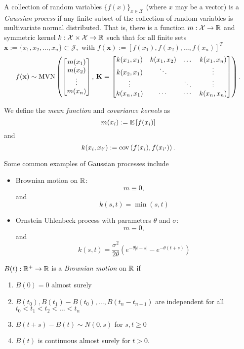\begin{definition}\label{def:gp}
    A collection of random variables $\{f(x)\}_{x\in\mathcal{X}}$
    (where $x$ may be a vector) is a \emph{Gaussian process} if any finite
    subset of the collection of random variables is multivariate normal
    distributed. That is, there is a function $m:\mathcal{X}\to\mathbb{R}$ and
    symmetric kernel $k:\mathcal{X}\times\mathcal{X}\to \mathbb{R}$ such that for all finite sets
    $\mathbf{x} :=\{x_1, x_2, \dots, x_n\} \subset \mathcal{J},$ with
    $f(\mathbf{x}) := [f(x_1), f(x_2), \dots, f(x_n)]^T$
    $$f(\mathbf{x}) \sim
        \operatorname{MVN}\left(\begin{bmatrix}
            m(x_1) \\ m(x_2)\\ \vdots\\ m(x_n)
        \end{bmatrix},\, \mathbf{K} = \begin{bmatrix}
            k(x_1, x_1) & k(x_1, x_2) & \dots  & k(x_1, x_n) \\
            k(x_2, x_1) & \ddots      &        & \vdots      \\
            \vdots      &             & \ddots & \vdots      \\
            k(x_n, x_1) & \cdots      & \cdots & k(x_n, x_n)
        \end{bmatrix}\right).$$
\end{definition}

\begin{definition}\label{def:mean_kernel}
    We define the \emph{mean function} and \emph{covariance kernels} as
    $$m(x_i) := \operatorname{\mathbb{E}}\left[f(x_i)\right]$$ and
    $$k(x_{i}, x_{i^\prime}) := \operatorname{cov}\left(f(x_i), f(x_{i^\prime})\right).$$
\end{definition}

Some common examples of Gaussian processes include \begin{itemize}
    \item Brownian motion on $\mathbb{R}$: $$m\equiv 0,$$ and $$k(s, t) = \min(s, t)$$
    \item Ornstein Uhlenbeck process with parameters $\theta$ and $\sigma$:
          $$m\equiv 0,$$ and
          $$k(s, t)
              = \frac{\sigma^2}{2\theta}
              \left(e^{-\theta|t - s|} - e^{-\theta(t + s)}\right)$$
\end{itemize}

\begin{definition}
    $B(t):\mathbb{R}^+ \to \mathbb{R}$ is a \emph{Brownian motion} on $\mathbb{R}$ if\begin{enumerate}
        \item $B(0) = 0$ almost surely
        \item $B(t_0), B(t_1) - B(t_0), \dots, B(t_n - t_{n-1})$ are independent for all $t_0<t_1<t_2<\dots<t_n$
        \item $B(t + s) - B(t)\sim N(0, s)$ for $s, t \geq 0$
        \item $B(t)$ is continuous almost surely for $t>0.$
    \end{enumerate}
\end{definition}

